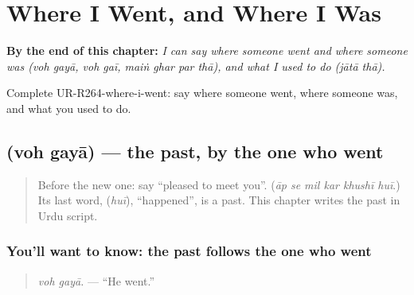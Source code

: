 
\chapter{Where I Went, and Where I Was}
\label{ch:ur-where-i-went-and-where-i-was}

\begin{chapteropening}
\textbf{By the end of this chapter:} \emph{I can say where someone went and where someone was (voh gayā, voh gaī, maiṅ ghar par thā), and what I used to do (jātā thā).}

Complete UR-R264-where-i-went: say where someone went, where someone was, and what you used to do.
\end{chapteropening}

\section[\texorpdfstring{\ur{وہ} \ur{گیا} (voh gayā)}{وہ گیا (voh gayā)}]{  (voh gayā) — the past, by the one who went}

\label{lesson:UR-C264-voh-gaya}



\begin{quote}
Before the new one: say \textquotedblleft{}pleased to meet you\textquotedblright{}. (\emph{āp se mil kar khushī huī}.) Its last word, \textbf{} (\emph{huī}), \textquotedblleft{}happened\textquotedblright{}, is a past. This chapter writes the past in Urdu script.
\end{quote}

\subsection*{You'll want to know: the past follows the one who went}
\begin{quote}
\textbf{ }
\end{quote}

\begin{quote}
\emph{voh gayā.} — \textquotedblleft{}He went.\textquotedblright{}
\end{quote}

\begin{quote}
\textbf{ }
\end{quote}

